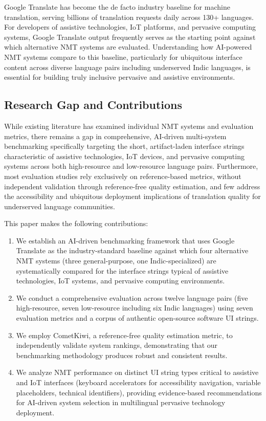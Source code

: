 \documentclass[Afour,sagev,times,doublespace]{sagej}
\begin{document}
Google Translate has become the de facto industry baseline for machine translation, serving billions of translation requests daily across 130+ languages. For developers of assistive technologies, IoT platforms, and pervasive computing systems, Google Translate output frequently serves as the starting point against which alternative NMT systems are evaluated. Understanding how AI-powered NMT systems compare to this baseline, particularly for ubiquitous interface content across diverse language pairs including underserved Indic languages, is essential for building truly inclusive pervasive and assistive environments.

\subsection{Research Gap and Contributions}

While existing literature has examined individual NMT systems and evaluation metrics, there remains a gap in comprehensive, AI-driven multi-system benchmarking specifically targeting the short, artifact-laden interface strings characteristic of assistive technologies, IoT devices, and pervasive computing systems across both high-resource and low-resource language pairs. Furthermore, most evaluation studies rely exclusively on reference-based metrics, without independent validation through reference-free quality estimation, and few address the accessibility and ubiquitous deployment implications of translation quality for underserved language communities.

This paper makes the following contributions:

\begin{enumerate}
\item We establish an AI-driven benchmarking framework that uses Google Translate as the industry-standard baseline against which four alternative NMT systems (three general-purpose, one Indic-specialized) are systematically compared for the interface strings typical of assistive technologies, IoT systems, and pervasive computing environments.
\item We conduct a comprehensive evaluation across twelve language pairs (five high-resource, seven low-resource including six Indic languages) using seven evaluation metrics and a corpus of authentic open-source software UI strings.
\item We employ CometKiwi, a reference-free quality estimation metric, to independently validate system rankings, demonstrating that our benchmarking methodology produces robust and consistent results.
\item We analyze NMT performance on distinct UI string types critical to assistive and IoT interfaces (keyboard accelerators for accessibility navigation, variable placeholders, technical identifiers), providing evidence-based recommendations for AI-driven system selection in multilingual pervasive technology deployment.
\end{enumerate}
\end{document}
